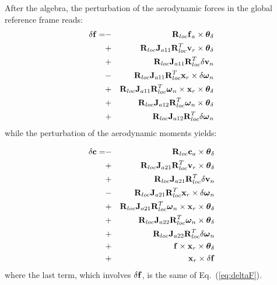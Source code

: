 After the algebra, the perturbation of the aerodynamic forces  
in the global reference frame reads:
\begin{eqnarray}\label{eq:deltaF}
\nonumber \delta\bm{\mathbf{f}} = 
\nonumber	&-& \bm{\mathbf{R}}_{loc}\bm{\mathbf{f}}_a\times\bm{\mathbf{\theta}}_\delta \\
\nonumber	&+& \bm{\mathbf{R}}_{loc}\bm{\mathbf{J}}_{a11}\bm{\mathbf{R}}^T_{loc}\bm{\mathbf{v}}_r\times\bm{\mathbf{\theta}}_\delta\\
\nonumber	&+& \bm{\mathbf{R}}_{loc}\bm{\mathbf{J}}_{a11}\bm{\mathbf{R}}^T_{loc}\delta\bm{\mathbf{v}}_n\\
\nonumber	&-& \bm{\mathbf{R}}_{loc}\bm{\mathbf{J}}_{a11}\bm{\mathbf{R}}^T_{loc}
			\bm{\mathbf{x}}_r\times\delta\bm{\mathbf{\omega}}_n\\
\nonumber	&+& \bm{\mathbf{R}}_{loc}\bm{\mathbf{J}}_{a11}\bm{\mathbf{R}}^T_{loc}
			\bm{\mathbf{\omega}}_n\times\bm{\mathbf{x}}_r\times\bm{\mathbf{\theta}}_\delta\\
\nonumber	&+& \bm{\mathbf{R}}_{loc}\bm{\mathbf{J}}_{a12}\bm{\mathbf{R}}^T_{loc}\bm{\mathbf{\omega}}_n
			\times\bm{\mathbf{\theta}}_\delta\\
		&+& \bm{\mathbf{R}}_{loc}\bm{\mathbf{J}}_{a12}\bm{\mathbf{R}}^T_{loc}\delta\bm{\mathbf{\omega}}_n
\end{eqnarray}
while the perturbation of the aerodynamic moments yields:

\begin{eqnarray}
\nonumber \delta\bm{\mathbf{c}} = 
\nonumber	&-& \bm{\mathbf{R}}_{loc}\bm{\mathbf{c}}_a\times\bm{\mathbf{\theta}}_\delta \\
\nonumber	&+& \bm{\mathbf{R}}_{loc}\bm{\mathbf{J}}_{a21}\bm{\mathbf{R}}^T_{loc}\bm{\mathbf{v}}_r\times\bm{\mathbf{\theta}}_\delta\\
\nonumber	&+& \bm{\mathbf{R}}_{loc}\bm{\mathbf{J}}_{a21}\bm{\mathbf{R}}^T_{loc}\delta\bm{\mathbf{v}}_n\\
\nonumber	&-& \bm{\mathbf{R}}_{loc}\bm{\mathbf{J}}_{a21}\bm{\mathbf{R}}^T_{loc}
			\bm{\mathbf{x}}_r\times\delta\bm{\mathbf{\omega}}_n\\
\nonumber	&+& \bm{\mathbf{R}}_{loc}\bm{\mathbf{J}}_{a21}\bm{\mathbf{R}}^T_{loc}
			\bm{\mathbf{\omega}}_n\times\bm{\mathbf{x}}_r\times\bm{\mathbf{\theta}}_\delta\\
\nonumber	&+& \bm{\mathbf{R}}_{loc}\bm{\mathbf{J}}_{a22}\bm{\mathbf{R}}^T_{loc}\bm{\mathbf{\omega}}_n
			\times\bm{\mathbf{\theta}}_\delta\\
\nonumber	&+& \bm{\mathbf{R}}_{loc}\bm{\mathbf{J}}_{a22}\bm{\mathbf{R}}^T_{loc}\delta\bm{\mathbf{\omega}}_n\\
\nonumber 	&+& \bm{\mathbf{f}}\times\bm{\mathbf{x}}_r\times\bm{\mathbf{\theta}}_\delta\\
		&+& \bm{\mathbf{x}}_r \times \delta\bm{\mathbf{f}}
\end{eqnarray}
where the last term, which involves $\delta\bm{\mathbf{f}}$, is the same of
Eq.~(\ref{eq:deltaF}).


